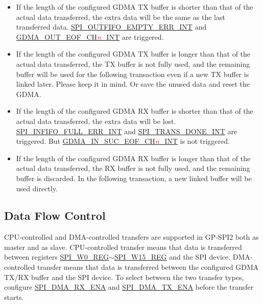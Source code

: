 \documentclass[main\_\_EN.tex]{subfiles}
\begin{document}
\begin{itemize}
    \item If the length of the configured GDMA TX buffer is shorter than that of the actual data transferred, the extra data will be the same as the last transferred data. \hyperref[int:SPIOUTFIFOEMPTYERRINT]{SPI\_OUTFIFO\_EMPTY\_ERR\_INT} and \hyperref[int:GDMAOUTEOFINT]{GDMA\_OUT\_EOF\_CH\textcolor{red}{\it{n}}\_INT} are triggered.

    \item If the length of the configured GDMA TX buffer is longer than that of the actual data transferred, the TX buffer is not fully used, and the remaining buffer will be used for the following transaction even if a new TX buffer is linked later. Please keep it in mind. Or save the unused data and reset the GDMA.

    \item If the length of the configured GDMA RX buffer is shorter than that of the actual data transferred, the extra data will be lost. \hyperref[int:SPIINFIFOFULLERRINT]{SPI\_INFIFO\_FULL\_ERR\_INT} and \hyperref[int:SPITRANSDONEINT]{SPI\_TRANS\_DONE\_INT} are triggered. But \hyperref[int:GDMAINSUCEOFINT]{GDMA\_IN\_SUC\_EOF\_CH\textcolor{red}{\it{n}}\_INT} is not triggered.

    \item If the length of the configured GDMA RX buffer is longer than that of the actual data transferred, the RX buffer is not fully used, and the remaining buffer is discarded. In the following transaction, a new linked buffer will be used directly.

\end{itemize}

\subsection{Data Flow Control}\label{Subsection:Data Flow Control in GP-SPI Master and Slave Mode}

CPU-controlled and DMA-controlled transfers are supported in GP-SPI2 both as master and as slave.
CPU-controlled transfer means that data is transferred between registers \hyperref[regdesc:SPIW0REG]{SPI\_W0\_REG}$\sim$\hyperref[regdesc:SPIW15REG]{SPI\_W15\_REG} and the SPI device. DMA-controlled transfer means that data is transferred between the configured GDMA TX/RX buffer and the SPI device. To select between the two transfer types, configure \hyperref[fielddesc:SPIDMARXENA]{SPI\_DMA\_RX\_ENA} and \hyperref[fielddesc:SPIDMATXENA]{SPI\_DMA\_TX\_ENA} before the transfer starts.
\end{document}
